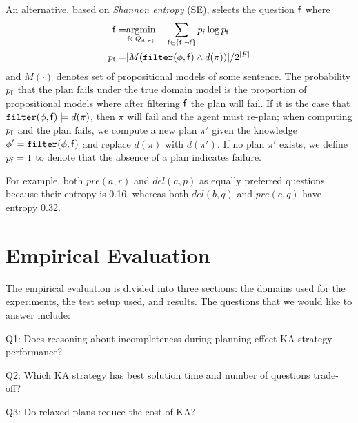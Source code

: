 \documentclass{article}
\begin{document}
An alternative, based on  {\em Shannon entropy} (SE),
selects the question ${\sf f}$ where
\begin{align}
{\sf f} = &\underset{{\sf f}  \in Q_{d(\pi)}}{\operatorname{argmin}} -
\sum\limits_{{\sf f} \in \{{\sf f}, \neg {\sf f}\}} p_{\sf f} \log p_{\sf f} 
\notag\\
 p_{\sf f} =& |M({\tt filter}(\phi, {\sf f}) \wedge 
d(\pi))|/2^{|F|}\notag
\end{align}
and $M(\cdot)$ denotes set of propositional models of some sentence.
The probability $p_{\sf f}$ that the plan fails under the true domain model
is the proportion of propositional models where after filtering ${\sf f}$ the
plan will fail.  If it is the case that ${\tt filter}(\phi, {\sf f}) \models 
d(\pi)$, then $\pi$ will  fail and the agent must re-plan; when computing
$p_{\sf f}$ and the plan fails, we compute a new plan $\pi'$ given the knowledge
$\phi' = {\tt filter}(\phi, {\sf f})$ and replace $d(\pi)$ with $d(\pi')$.  If
no plan $\pi'$ exists, we define $p_{\sf f} = 1$ to denote that the absence of
a plan indicates failure. 

For example, both $pre(a, r)$ and $del(a,
p)$ as equally preferred questions because their entropy is 0.16, whereas both
$del(b, q)$ and $pre(c, q)$ have entropy 0.32.



\section{Empirical Evaluation}
The empirical evaluation is divided into three sections:  the domains used for
the experiments, the test setup used, and results.  The questions that we would like to answer
include:



\begin{packed_itemize}
  \item Q1: Does reasoning about incompleteness during planning 
  effect KA strategy performance?
  \item Q2: Which KA strategy has best solution time and
  number of questions trade-off?
  \item Q3: Do relaxed plans reduce the cost of KA?
\end{packed_itemize}
\end{document}
